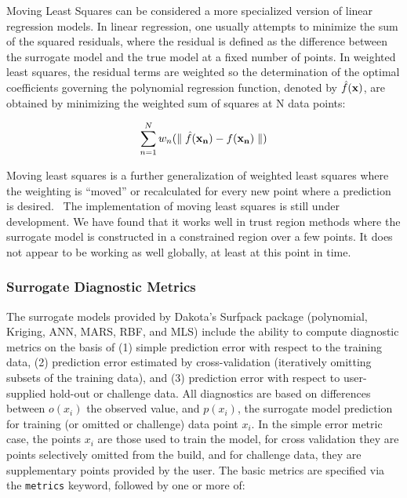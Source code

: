 Moving Least Squares can be considered a more specialized 
version of linear regression models.  In linear regression, 
one usually attempts to minimize the sum of the squared residuals, 
where the residual is defined as the difference between the 
surrogate model and the true model at a fixed number of points. 
In weighted least squares, the residual terms are weighted so the 
determination of the optimal coefficients governing the polynomial 
regression function, denoted by $\hat{f}({\bf x})$, are obtained by 
minimizing the weighted sum of squares at N data points: 

\begin{equation}
  \sum_{n=1}^{N}w_{n}({\parallel \hat{f}({\bf x_{n}})-f({\bf x_{n}})\parallel})
  \label{models:surf:equation12}  
\end{equation}

Moving least squares is a further generalization of weighted least squares
where the weighting is ``moved'' or recalculated for every new point where 
a prediction is desired.~\cite{Nea04}  The implementation of 
moving least squares 
is still under development.  We have found that it works well 
in trust region methods where the surrogate model is constructed in 
a constrained region over a few points.  It does not appear to be working 
as well globally, at least at this point in time.


\subsubsection{Surrogate Diagnostic Metrics}\label{models:surf:diagnostics}

The surrogate models provided by Dakota's Surfpack package
(polynomial, Kriging, ANN, MARS, RBF, and MLS) include the ability to
compute diagnostic metrics on the basis of (1) simple prediction error
with respect to the training data, (2) prediction error estimated by
cross-validation (iteratively omitting subsets of the training data),
and (3) prediction error with respect to user-supplied hold-out or
challenge data.  All diagnostics are based on differences between
$o(x_i)$ the observed value, and $p(x_i)$, the surrogate model
prediction for training (or omitted or challenge) data point $x_i$.
In the simple error metric case, the points $x_i$ are those used to
train the model, for cross validation they are points selectively
omitted from the build, and for challenge data, they are supplementary
points provided by the user.  The basic metrics are specified via the
{\tt metrics} keyword, followed by one or more of:

